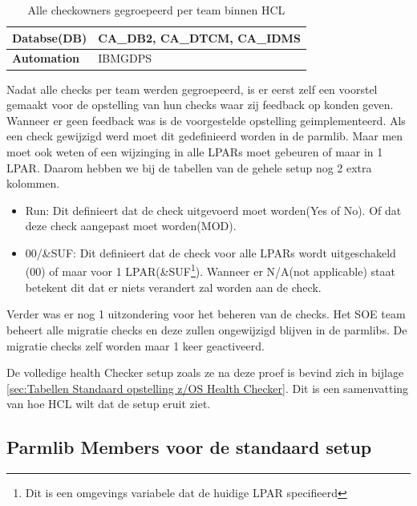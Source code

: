 \begin{table}[h]
\begin{tabular}{|l|p{9cm}|}
		\textbf{Databse(DB)}               & CA\_DB2, CA\_DTCM, CA\_IDMS                                                                                                                                            \\ \hline
		\textbf{Automation}                & IBMGDPS                                                                                                                                                                \\ \hline
	\end{tabular}
	\caption[Checks Per team]{Alle checkowners gegroepeerd per team binnen HCL}
	\label{tbl:Checks Per Team}
\end{table}

Nadat alle checks per team werden gegroepeerd, is er eerst zelf een voorstel gemaakt voor de opstelling van hun checks waar zij feedback op konden geven. Wanneer er geen feedback was is de voorgestelde opstelling geimplementeerd. Als een check gewijzigd werd moet dit gedefinieerd worden in de parmlib. Maar men moet ook weten of een wijzinging in alle LPARs moet gebeuren of maar in 1 LPAR. Daarom hebben we bij de tabellen van de gehele setup nog 2 extra kolommen.

\begin{itemize}
	\item Run: Dit definieert dat de check uitgevoerd moet worden(Yes of No). Of dat deze check aangepast moet worden(MOD).
	\item 00/\&SUF: Dit definieert dat de check voor alle LPARs wordt uitgeschakeld (00) of maar voor 1 LPAR(\&SUF\footnote{Dit is een omgevings variabele dat de huidige LPAR specifieerd}). Wanneer er N/A(not applicable) staat betekent dit dat er niets verandert zal worden aan de check.
\end{itemize}

Verder was er nog 1 uitzondering voor het beheren van de checks. Het SOE team beheert alle migratie checks en deze zullen ongewijzigd blijven in de parmlibs. De migratie checks zelf worden maar 1 keer geactiveerd.

De volledige health Checker setup zoals ze na deze proef is bevind zich in bijlage \ref{sec:Tabellen Standaard opstelling z/OS Health Checker}. Dit is een samenvatting van hoe HCL wilt dat de setup eruit ziet. 

\subsection{Parmlib Members voor de standaard setup}
\label{subsec:Parmlib Members voor de standaard setup}


